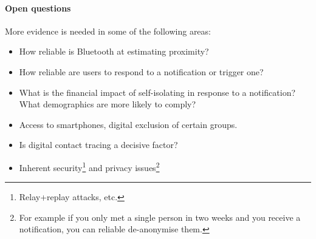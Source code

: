 \paragraph{Open questions}
More evidence is needed in some of the following areas:
\begin{itemize}
	\item How reliable is Bluetooth at estimating proximity?
	\item How reliable are users to respond to a notification or trigger one?
	\item What is the financial impact of self-isolating in response to a notification?
	What demographics are more likely to comply?
	\item Access to smartphones, digital exclusion of certain groups.
	\item Is digital contact tracing a decisive factor?
	\item Inherent security\footnote{Relay+replay attacks, etc.} and privacy issues\footnote{For example if you only met a single person in two weeks and you receive a notification, you can reliable de-anonymise them.}
\end{itemize}


